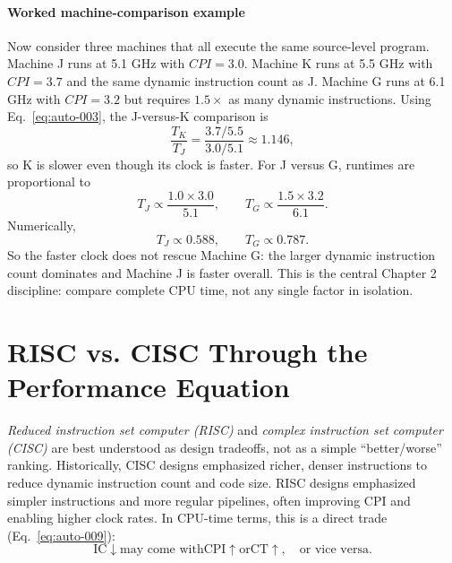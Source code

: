 \paragraph{Worked machine-comparison example}\label{par:auto-009a}
Now consider three machines that all execute the same source-level program.
Machine J runs at 5.1 GHz with $CPI=3.0$.
Machine K runs at 5.5 GHz with $CPI=3.7$ and the same dynamic instruction count as J\@.
Machine G runs at 6.1 GHz with $CPI=3.2$ but requires $1.5\times$ as many dynamic instructions.
Using Eq.~\eqref{eq:auto-003}, the J-versus-K comparison is
\begin{equation}\label{eq:auto-008a}
    \frac{T_K}{T_J}=\frac{3.7/5.5}{3.0/5.1}\approx 1.146,
\end{equation}
so K is slower even though its clock is faster.
For J versus G, runtimes are proportional to
\begin{equation}\label{eq:auto-008c}
    T_J \propto \frac{1.0\times 3.0}{5.1}, \qquad
    T_G \propto \frac{1.5\times 3.2}{6.1}.
\end{equation}
Numerically,
\begin{equation}\label{eq:auto-008b}
    T_J \propto 0.588,\qquad
    T_G \propto 0.787.
\end{equation}
So the faster clock does not rescue Machine G\@: the larger dynamic instruction count dominates and Machine J is faster overall.
This is the central Chapter 2 discipline: compare complete CPU time, not any single factor in isolation.


\section{RISC vs. CISC Through the Performance Equation}\label{sec:auto-013}
\textit{Reduced instruction set computer (RISC)} and \textit{complex instruction set computer (CISC)} are best understood as design tradeoffs, not as a simple ``better/worse'' ranking.
Historically, CISC designs emphasized richer, denser instructions to reduce dynamic instruction count and code size.
RISC designs emphasized simpler instructions and more regular pipelines, often improving CPI and enabling higher clock rates.
In CPU-time terms, this is a direct trade (Eq.~\eqref{eq:auto-009}):
\begin{equation}\label{eq:auto-009}
    \text{IC}\downarrow \text{may come with} \text{CPI}\uparrow \text{or} \text{CT}\uparrow,\quad
    \text{or vice versa.}
\end{equation}

